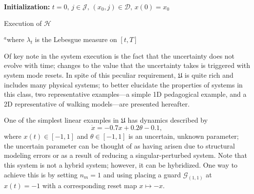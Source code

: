 \begin{algorithm}[!t]
\small
 {\bf Initialization:} $t=0,\,j\in \mathcal J,\,(x_0,j)\in \mathcal D,\,x(0)=x_0$\;
 \While{1}{
 {\em Let} $\theta$ be drawn according to $\mu_{\theta_j}$\;
 {\em Let} $\gamma\colon [0,T]\rightarrow \mathrm{M}_j$, abs. ct. st.\\\hspace{.2in}
 $\dot \gamma(s)=\tilde f(\gamma(s),\theta)$ $\lambda_t^{\text{\tiny a}}$-a.e., $s\in [t,T]$\\\hspace{.2in}
 $\gamma(t)=x(t)$\;
 $\Lambda_{(j,t)}:=\{r\in [t,T]| \exists (j,k)\in \mathcal E \text{ st. } (\gamma(r),\theta)\in \mathcal G_{(j,k)}\}$\;
 \eIf {$\Lambda_{(j,t)}\ne \emptyset$}{%
    $t':=\min \Lambda_{(j,t)}$, $k$ st. $\gamma(t')\in \pi_{x}(\mathcal G_{(j,k)})$\\\hspace{.2in}
     $x(s)\leftarrow \gamma(s)$, $\forall s\in [t,t')$\\ \hspace{.2in}
    $t\leftarrow t',\,x(t')\leftarrow R_{(j,k)}(\gamma(t')),\,j\leftarrow k$
 }
 {
 $x(s)=\gamma(s),\,\forall s\in [t,T]$\;
 Stop\;
 }
 }
 \caption{Execution of $\mathcal H$}
 \label{alg:execution}
 $^a$where $\lambda_t$ is the Lebesgue measure on $[t,T]$
\end{algorithm}
Of key note in the system execution is the fact that the uncertainty does not evolve with time; changes to the value that the uncertainty takes is triggered with system mode resets. In spite of this peculiar requirement, $\mathfrak{U}$ is quite rich and includes many physical systems; to better elucidate the properties of systems in this class, two representative examples---a simple 1D pedagogical example, and a 2D representative of walking models---are presented hereafter.
\begin{example}
\label{example:1D}
One of the simplest linear examples in $\mathfrak{U}$ has dynamics described by
$$
	\dot x = -0.7x+0.2\theta-0.1,
$$
where \mbox{$x(t)\in [-1,1]$} and $\theta\in [-1,1]$ is an uncertain, unknown parameter; the uncertain parameter can be thought of as having arisen due to structural modeling errors or as a result of reducing a singular-perturbed system. Note that this system is not a hybrid system; however, it can be hybridized. One way to achieve this is by setting $n_m=1$ and using placing a guard $\mathcal G_{(1,1)}$ at $x(t)=-1$ with a corresponding reset map $x\mapsto -x$.
\end{example}
